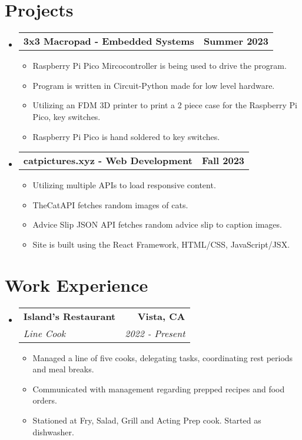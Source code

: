 \documentclass[letterpaper,11pt]{article}
\makeatletter
\newcommand{\resumeItem}[1]{
  \item\small{
    {#1 \vspace{-3pt}}
  }
}
\newcommand{\resumeSubheading}[4]{
  \vspace{-3pt}\item
    \begin{tabular*}{1.0\textwidth}[t]{l@{\extracolsep{\fill}}r}
      \textbf{#1} & \textbf{\small #2} \\
      \textit{\small#3} & \textit{\small #4} \\
    \end{tabular*}\vspace{-7pt}
}
\newcommand{\resumeProjectHeading}[2]{
  \vspace{-3pt}\item
    \begin{tabular*}{1.0\textwidth}[t]{l@{\extracolsep{\fill}}r}
      \textbf{#1} & \textbf{\small #2} \\
    \end{tabular*}\vspace{-7pt}
}
\newcommand{\resumeSubHeadingListStart}{\begin{itemize}[leftmargin=0.0in, label={}]}
\newcommand{\resumeSubHeadingListEnd}{\end{itemize}}
\newcommand{\resumeItemListStart}{\begin{itemize}}
\newcommand{\resumeItemListEnd}{\end{itemize}\vspace{0pt}}
\makeatother
\begin{document}
\section{Projects} 
    \resumeSubHeadingListStart
        \resumeProjectHeading
        {3x3 Macropad - Embedded Systems}
        {Summer 2023}
        \resumeItemListStart
            \resumeItem{Raspberry Pi Pico Mircocontroller is being used to drive the program.}
            \resumeItem{Program is written in Circuit-Python made for low level hardware.}
            \resumeItem{Utilizing an FDM 3D printer to print a 2 piece case for the Raspberry Pi Pico, key switches.}
            \resumeItem{Raspberry Pi Pico is hand soldered to key switches.}
            \resumeItemListEnd
        \resumeProjectHeading
        {catpictures.xyz - Web Development}
        {Fall 2023}
        \resumeItemListStart
            \resumeItem{Utilizing multiple APIs to load responsive content.}
            \resumeItem{TheCatAPI fetches random images of cats.}
            \resumeItem{Advice Slip JSON API fetches random advice slip to caption images.}
            \resumeItem{Site is built using the React Framework, HTML/CSS, JavaScript/JSX.}
        \resumeItemListEnd
        
    \resumeSubHeadingListEnd

\section{Work Experience}
    \resumeSubHeadingListStart
    
        \resumeSubheading
        {Island's Restaurant}{Vista, CA}
            {Line Cook}{2022 - Present}
            \resumeItemListStart
                \resumeItem{Managed a line of five cooks, delegating tasks, coordinating rest periods and meal breaks.}
                \resumeItem{Communicated with management regarding prepped recipes and food orders.}
                \resumeItem{Stationed at Fry, Salad, Grill and Acting Prep cook. Started as dishwasher.}
            \resumeItemListEnd
    \resumeSubHeadingListEnd
 
\end{document}
